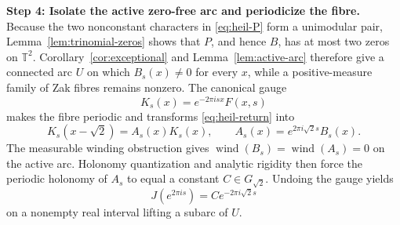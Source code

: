 \documentclass[reqno]{amsart}
\theoremstyle{remark}
\numberwithin{equation}{section}
\newcommand{\T}{\mathbb{T}}
\newcommand{\wind}{\operatorname{wind}}
\begin{document}
\smallskip
\noindent
\textbf{Step 4: Isolate the active zero-free arc and periodicize the fibre.}
Because the two nonconstant characters in \eqref{eq:heil-P} form a
unimodular pair, Lemma~\ref{lem:trinomial-zeros} shows that \(P\), and hence
\(B\), has at most two zeros on \(\T^2\). Corollary~\ref{cor:exceptional}
and Lemma~\ref{lem:active-arc} therefore give a connected arc \(U\) on which
\(B_s(x)\neq0\) for every \(x\), while a positive-measure family of Zak
fibres remains nonzero. The canonical gauge
\begin{equation}
  K_s(x)=e^{-2\pi isx}F(x,s)
  \label{eq:heil-periodic-gauge}
\end{equation}
makes the fibre periodic and transforms \eqref{eq:heil-return} into
\begin{equation}
  K_s(x-\sqrt2)=A_s(x)K_s(x),
  \qquad
  A_s(x)=e^{2\pi i\sqrt2s}B_s(x).
  \label{eq:heil-periodic-cocycle}
\end{equation}
The measurable winding obstruction gives \(\wind(B_s)=\wind(A_s)=0\) on
the active arc. Holonomy quantization and analytic rigidity then force the
periodic holonomy of \(A_s\) to equal a constant \(C\in G_{\sqrt2}\).
Undoing the gauge yields
\begin{equation}
  J(e^{2\pi is})=Ce^{-2\pi i\sqrt2s}
  \label{eq:heil-character-law}
\end{equation}
on a nonempty real interval lifting a subarc of \(U\).
\end{document}
